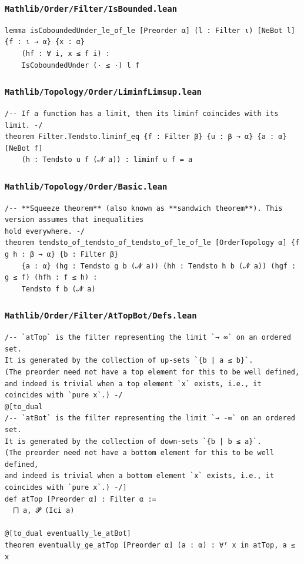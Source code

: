 \subsubsection{\texttt{Mathlib/Order/Filter/IsBounded.lean}}
\begin{lstlisting}[language=lean]
lemma isCoboundedUnder_le_of_le [Preorder α] (l : Filter ι) [NeBot l] {f : ι → α} {x : α}
    (hf : ∀ i, x ≤ f i) :
    IsCoboundedUnder (· ≤ ·) l f
\end{lstlisting}

\subsubsection{\texttt{Mathlib/Topology/Order/LiminfLimsup.lean}}
\begin{lstlisting}[language=lean]
/-- If a function has a limit, then its liminf coincides with its limit. -/
theorem Filter.Tendsto.liminf_eq {f : Filter β} {u : β → α} {a : α} [NeBot f]
    (h : Tendsto u f (𝓝 a)) : liminf u f = a
\end{lstlisting}

\newpage
\subsubsection{\texttt{Mathlib/Topology/Order/Basic.lean}}
\begin{lstlisting}[language=lean]
/-- **Squeeze theorem** (also known as **sandwich theorem**). This version assumes that inequalities
hold everywhere. -/
theorem tendsto_of_tendsto_of_tendsto_of_le_of_le [OrderTopology α] {f g h : β → α} {b : Filter β}
    {a : α} (hg : Tendsto g b (𝓝 a)) (hh : Tendsto h b (𝓝 a)) (hgf : g ≤ f) (hfh : f ≤ h) :
    Tendsto f b (𝓝 a)
\end{lstlisting}

\subsubsection{\texttt{Mathlib/Order/Filter/AtTopBot/Defs.lean}}
\begin{lstlisting}[language=lean]
/-- `atTop` is the filter representing the limit `→ ∞` on an ordered set.
It is generated by the collection of up-sets `{b | a ≤ b}`.
(The preorder need not have a top element for this to be well defined,
and indeed is trivial when a top element `x` exists, i.e., it coincides with `pure x`.) -/
@[to_dual
/-- `atBot` is the filter representing the limit `→ -∞` on an ordered set.
It is generated by the collection of down-sets `{b | b ≤ a}`.
(The preorder need not have a bottom element for this to be well defined,
and indeed is trivial when a bottom element `x` exists, i.e., it coincides with `pure x`.) -/]
def atTop [Preorder α] : Filter α :=
  ⨅ a, 𝓟 (Ici a)

@[to_dual eventually_le_atBot]
theorem eventually_ge_atTop [Preorder α] (a : α) : ∀ᶠ x in atTop, a ≤ x
\end{lstlisting}

